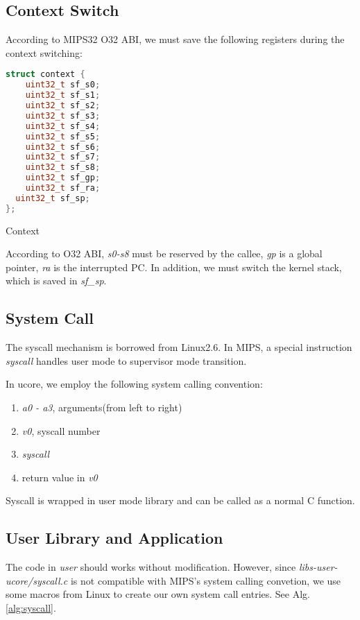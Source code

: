 \documentclass[a4paper]{article}
\begin{document}
\subsection{Context Switch}
According to MIPS32 O32 ABI, we must save the following registers
during the context switching:

\begin{algorithm}[H]
 \begin{lstlisting}[language={C++}]
struct context {
	uint32_t sf_s0;
	uint32_t sf_s1;
	uint32_t sf_s2;
	uint32_t sf_s3;
	uint32_t sf_s4;
	uint32_t sf_s5;
	uint32_t sf_s6;
	uint32_t sf_s7;
	uint32_t sf_s8;
	uint32_t sf_gp;
	uint32_t sf_ra;
  uint32_t sf_sp;
};

\end{lstlisting}
\caption{Context}
\label{alg:context}
\end{algorithm}

According to O32 ABI, \emph{s0-s8} must be reserved by the callee,
\emph{gp} is a global pointer, \emph{ra} is the interrupted PC.
In addition, we must switch the kernel stack, which is saved in \emph{sf\_sp}.


\subsection{System Call}
The syscall mechanism is borrowed from Linux2.6. In MIPS, a special 
instruction \emph{syscall} handles user mode to supervisor mode transition.

In ucore, we employ the following system calling convention:
\begin{enumerate}
  \item \emph{a0 - a3}, arguments(from left to right)
  \item \emph{v0}, syscall number
  \item \emph{syscall}
  \item return value in \emph{v0}
\end{enumerate}

Syscall is wrapped in user mode library and can be called as a normal 
C function. 

\subsection{User Library and Application}
The code in \emph{user}
should works without modification. However, since \emph{libs-user-ucore/syscall.c} is not compatible with MIPS's 
system calling convetion, we use some macros from Linux
to create our own system call entries. See Alg. \ref{alg:syscall}.
\end{document}
